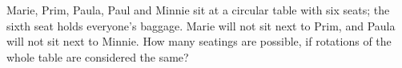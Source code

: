 Marie, Prim, Paula, Paul and Minnie sit at a circular table with six seats; the sixth seat holds everyone's baggage. Marie will not sit next to Prim, and Paula will not sit next to Minnie. How many seatings are possible, if rotations of the whole table are considered the same?

